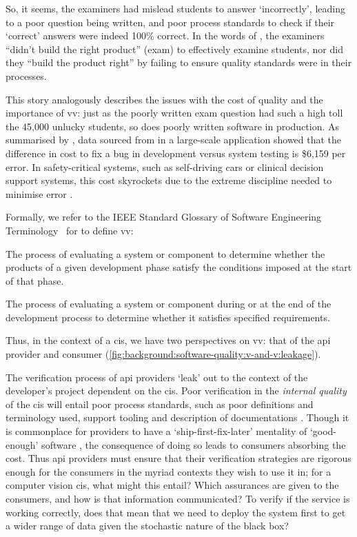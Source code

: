 So, it seems, the examiners had mislead students to answer `incorrectly', leading to a poor question being written, and poor process standards to check if their `correct' answers were indeed 100\% correct. In the words of \citet{Boehm:1981ua}, the examiners ``didn't build the right product'' (exam) to effectively examine students, nor did they ``build the product right'' by failing to ensure quality standards were in their processes. 

This story analogously describes the issues with the cost of quality \citep{Boehm:2005vj} and the importance of \gls{vv}: just as the poorly written exam question had such a high toll the 45,000 unlucky students, so does poorly written software in production. As summarised by \citet{Pressman:2005vf}, data sourced from \citet{Cigital:2003tl} in a large-scale application showed that the difference in cost to fix a bug in development versus system testing is \$6,159 per error. In safety-critical systems, such as self-driving cars or clinical decision support systems, this cost skyrockets due to the extreme discipline needed to minimise error \citep{Tassey:2002vu}.

Formally, we refer to the IEEE Standard Glossary of Software Engineering Terminology~\citep{IEEE:1990wp} for to define \gls{vv}:

\begin{description}[font=\itshape,style=multiline,leftmargin=3cm]
  \item[verification] The process of evaluating a system or component to determine whether the products of a given development phase satisfy the conditions imposed at the start of that phase.
  \item[validation] The process of evaluating a system or component during or at the end of the development process to determine whether it satisfies specified requirements. 
\end{description} 

\noindent
Thus, in the context of a \gls{cis}, we have two perspectives on \gls{vv}: that of the \gls{api} provider and consumer (\cref{fig:background:software-quality:v-and-v:leakage}).

The verification process of \gls{api} providers `leak' out to the context of the developer's project dependent on the \gls{cis}. Poor verification in the \textit{internal quality} of the \gls{cis} will entail poor process standards, such as poor definitions and terminology used, support tooling and description of documentations \citep{Sommerville:2011uc}. Though it is commonplace for providers to have a `ship-first-fix-later' mentality of `good-enough' software \citep{Venners:2003vw}, the consequence of doing so leads to consumers absorbing the cost. Thus \gls{api} providers must ensure that their verification strategies are rigorous enough for the consumers in the myriad contexts they wish to use it in; for a computer vision \gls{cis}, what might this entail? Which assurances are given to the consumers, and how is that information communicated? To verify if the service is working correctly, does that mean that we need to deploy the system first to get a wider range of data given the stochastic nature of the black box?

